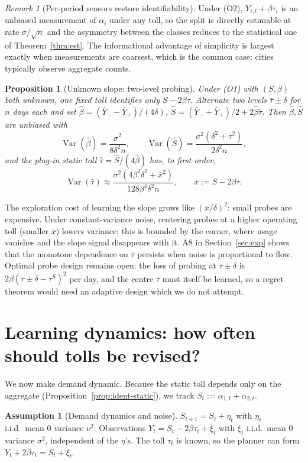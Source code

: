 \documentclass[11pt]{article}
\newtheorem{proposition}[theorem]{Proposition}
\theoremstyle{definition}
\newtheorem{assumption}[theorem]{Assumption}
\theoremstyle{remark}
\newtheorem{remark}[theorem]{Remark}
\newcommand{\Var}{\operatorname{Var}}
\begin{document}
\begin{remark}[Per-period sensors restore identifiability]\label{rem:o2}
Under (O2), $Y_{i,t}+\beta\tau_i$ is an unbiased measurement of $\alpha_i$ under any toll, so the split is directly estimable at rate $\sigma/\sqrt n$ and the asymmetry between the classes reduces to the statistical one of Theorem~\ref{thm:est}. The informational advantage of simplicity is largest exactly when measurements are coarsest, which is the common case: cities typically observe aggregate counts.
\end{remark}

\begin{proposition}[Unknown slope: two-level probing]\label{prop:slope}
Under (O1) with $(S,\beta)$ both unknown, one fixed toll identifies only $S-2\beta\tau$. Alternate two levels $\bar\tau\pm\delta$ for $n$ days each and set $\hat\beta=(\bar Y_--\bar Y_+)/(4\delta)$, $\hat S=(\bar Y_-+\bar Y_+)/2+2\hat\beta\bar\tau$. Then $\hat\beta,\hat S$ are unbiased with
\[\Var(\hat\beta)=\frac{\sigma^2}{8\delta^2n},\qquad\Var(\hat S)=\frac{\sigma^2(\delta^2+\bar\tau^2)}{2\delta^2n},\]
and the plug-in static toll $\hat\tau=\hat S/(4\hat\beta)$ has, to first order,
\[\Var(\hat\tau)\approx\frac{\sigma^2(4\beta^2\delta^2+\bar x^2)}{128\beta^4\delta^2n},\qquad\bar x:=S-2\beta\bar\tau.\]
\end{proposition}
The exploration cost of learning the slope grows like $(\bar x/\delta)^2$: small probes are expensive. Under constant-variance noise, centering probes at a higher operating toll (smaller $\bar x$) lowers variance; this is bounded by the corner, where usage vanishes and the slope signal disappears with it. A8 in Section~\ref{sec:exp} shows that the monotone dependence on $\bar\tau$ persists when noise is proportional to flow. Optimal probe design remains open: the loss of probing at $\bar\tau\pm\delta$ is $2\beta(\bar\tau\pm\delta-\tau^S)^2$ per day, and the centre $\bar\tau$ must itself be learned, so a regret theorem would need an adaptive design which we do not attempt.

\section{Learning dynamics: how often should tolls be revised?}\label{sec:dyn}
We now make demand dynamic. Because the static toll depends only on the aggregate (Proposition~\ref{prop:ident-static}), we track $S_t:=\alpha_{1,t}+\alpha_{2,t}$.

\begin{assumption}[Demand dynamics and noise]\label{ass:rw}
$S_{t+1}=S_t+\eta_t$ with $\eta_t$ i.i.d.\ mean $0$ variance $\nu^2$. Observations $Y_t=S_t-2\beta\tau_t+\xi_t$ with $\xi_t$ i.i.d.\ mean $0$ variance $\sigma^2$, independent of the $\eta$'s. The toll $\tau_t$ is known, so the planner can form $Y_t+2\beta\tau_t=S_t+\xi_t$.
\end{assumption}
\end{document}
